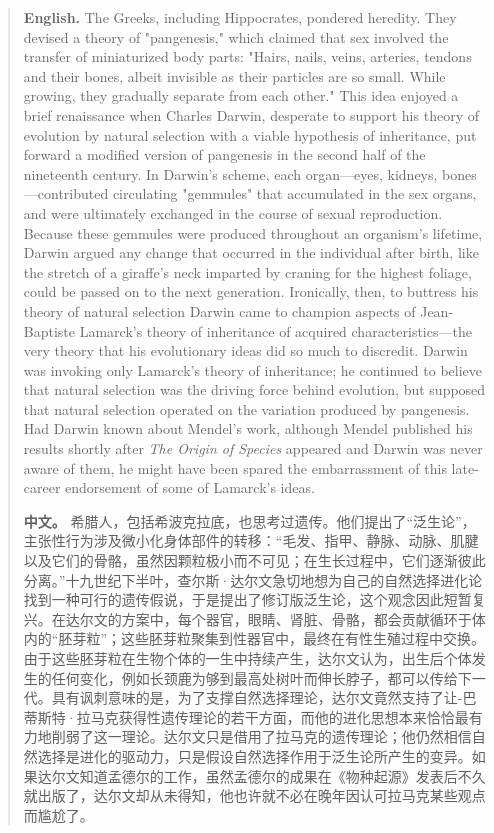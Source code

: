 \begin{quote}
\noindent\textbf{English.} The Greeks, including Hippocrates, pondered heredity. They devised a theory of "pangenesis," which claimed that sex involved the transfer of miniaturized body parts: "Hairs, nails, veins, arteries, tendons and their bones, albeit invisible as their particles are so small. While growing, they gradually separate from each other." This idea enjoyed a brief renaissance when Charles Darwin, desperate to support his theory of evolution by natural selection with a viable hypothesis of inheritance, put forward a modified version of pangenesis in the second half of the nineteenth century. In Darwin's scheme, each organ---eyes, kidneys, bones---contributed circulating "gemmules" that accumulated in the sex organs, and were ultimately exchanged in the course of sexual reproduction. Because these gemmules were produced throughout an organism's lifetime, Darwin argued any change that occurred in the individual after birth, like the stretch of a giraffe's neck imparted by craning for the highest foliage, could be passed on to the next generation. Ironically, then, to buttress his theory of natural selection Darwin came to champion aspects of Jean-Baptiste Lamarck's theory of inheritance of acquired characteristics---the very theory that his evolutionary ideas did so much to discredit. Darwin was invoking only Lamarck's theory of inheritance; he continued to believe that natural selection was the driving force behind evolution, but supposed that natural selection operated on the variation produced by pangenesis. Had Darwin known about Mendel's work, although Mendel published his results shortly after \emph{The Origin of Species} appeared and Darwin was never aware of them, he might have been spared the embarrassment of this late-career endorsement of some of Lamarck's ideas.

\smallskip
\noindent\textbf{中文。} 希腊人，包括希波克拉底，也思考过遗传。他们提出了“泛生论”，主张性行为涉及微小化身体部件的转移：“毛发、指甲、静脉、动脉、肌腱以及它们的骨骼，虽然因颗粒极小而不可见；在生长过程中，它们逐渐彼此分离。”十九世纪下半叶，查尔斯·达尔文急切地想为自己的自然选择进化论找到一种可行的遗传假说，于是提出了修订版泛生论，这个观念因此短暂复兴。在达尔文的方案中，每个器官，眼睛、肾脏、骨骼，都会贡献循环于体内的“胚芽粒”；这些胚芽粒聚集到性器官中，最终在有性生殖过程中交换。由于这些胚芽粒在生物个体的一生中持续产生，达尔文认为，出生后个体发生的任何变化，例如长颈鹿为够到最高处树叶而伸长脖子，都可以传给下一代。具有讽刺意味的是，为了支撑自然选择理论，达尔文竟然支持了让-巴蒂斯特·拉马克获得性遗传理论的若干方面，而他的进化思想本来恰恰最有力地削弱了这一理论。达尔文只是借用了拉马克的遗传理论；他仍然相信自然选择是进化的驱动力，只是假设自然选择作用于泛生论所产生的变异。如果达尔文知道孟德尔的工作，虽然孟德尔的成果在《物种起源》发表后不久就出版了，达尔文却从未得知，他也许就不必在晚年因认可拉马克某些观点而尴尬了。
\end{quote}

